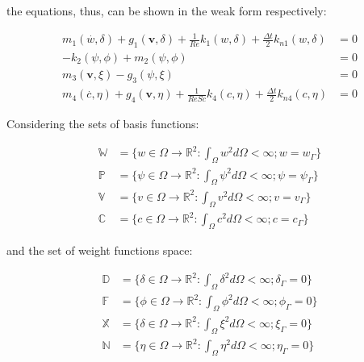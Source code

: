 \noindent
the equations, thus, can be shown in the weak form respectively:

\begin{align}
 \textbf{$m_1$}(\overset{.}{w},\delta) + \textbf{$g_1$}(\textbf{v},\delta) 
 + \frac{1}{\textit{Re}}\textbf{$k_1$}(w,\delta) + \frac{\Delta t}{2} \textbf{$k_{n1}$}(w,\delta) &= 0 \\
 -\textbf{$k_2$}(\psi,\phi) + \textbf{$m_2$}(\psi,\phi) &= 0 \\
  \textbf{$m_3$}(\textbf{v},\xi) - \textbf{$g_3$}(\psi,\xi) &= 0 \\
 \textbf{$m_4$}(\overset{.}{c},\eta) + \textbf{$g_4$}(\textbf{v},\eta) 
 + \frac{1}{\textit{ReSc}}\textbf{$k_4$}(c,\eta) +\frac{\Delta t}{2} \textbf{$k_{n4}$}(c,\eta) &= 0
\end{align}


\noindent
Considering the sets of basis functions:

\begin{equation}
 \begin{aligned}
  \mathbb{W} &= \{w \in \Omega \rightarrow \mathbb{R}^2
  : \int_\Omega w^2 d\Omega < \infty 
  ; w = w_\Gamma\} \\
  \mathbb{P} &= \{\psi \in \Omega \rightarrow \mathbb{R}^2
  : \int_\Omega \psi^2 d\Omega < \infty 
  ; \psi = \psi_\Gamma\} \\
  \mathbb{V} &= \{v \in \Omega \rightarrow \mathbb{R}^2
  : \int_\Omega v^2 d\Omega < \infty 
  ; v = v_\Gamma\} \\
  \mathbb{C} &= \{c \in \Omega \rightarrow \mathbb{R}^2
  : \int_\Omega c^2 d\Omega < \infty 
  ; c = c_\Gamma\}
 \end{aligned}
\end{equation}

\noindent
and the set of weight functions space:

\begin{equation}
 \begin{aligned}
  \mathbb{D} &= \{\delta \in \Omega \rightarrow \mathbb{R}^2
  : \int_\Omega \delta^2 d\Omega < \infty
  ; \delta_\Gamma = 0\} \\
  \mathbb{F} &= \{\phi \in \Omega \rightarrow \mathbb{R}^2
  : \int_\Omega \phi^2 d\Omega < \infty 
  ; \phi_\Gamma = 0\} \\
  \mathbb{X} &= \{\delta \in \Omega \rightarrow \mathbb{R}^2
  : \int_\Omega \xi^2 d\Omega < \infty 
  ; \xi_\Gamma = 0\} \\
  \mathbb{N} &= \{\eta \in \Omega \rightarrow \mathbb{R}^2
  : \int_\Omega \eta^2 d\Omega < \infty 
  ; \eta_\Gamma = 0\}
 \end{aligned}
\end{equation}

